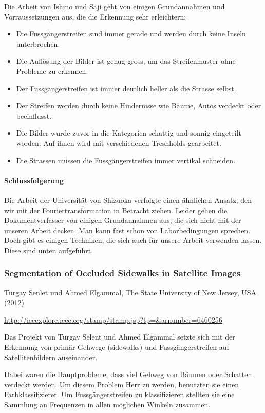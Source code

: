 Die Arbeit von Ishino und Saji geht von einigen Grundannahmen und Vorraussetzungen aus, die die Erkennung sehr erleichtern:

\begin{itemize}
	\item Die Fussgängerstreifen sind immer gerade und werden durch keine Inseln unterbrochen.
	\item Die Auflösung der Bilder ist genug gross, um das Streifenmuster ohne Probleme zu erkennen.
	\item Der Fussgängerstreifen ist immer deutlich heller als die Strasse selbst.
	\item Der Streifen werden durch keine Hindernisse wie Bäume, Autos verdeckt oder beeinflusst.
	\item Die Bilder wurde zuvor in die Kategorien schattig und sonnig eingeteilt worden. Auf ihnen wird mit verschiedenen Treshholds gearbeitet.
	\item Die Strassen müssen die Fussgängerstreifen immer vertikal schneiden.
\end{itemize}

\paragraph{Schlussfolgerung}
Die Arbeit der Universität von Shizuoka verfolgte einen ähnlichen Ansatz, den wir mit der Fouriertransformation in Betracht ziehen. Leider gehen die Dokumentverfasser von einigen Grundannahmen aus, die sich nicht mit der unseren Arbeit decken. Man kann fast schon von Laborbedingungen sprechen.
Doch gibt es einigen Techniken, die sich auch für unsere Arbeit verwenden lassen. Diese sind unten aufgeführt.

\subsubsection{Segmentation of Occluded Sidewalks in Satellite Images}
Turgay Senlet und Ahmed Elgammal, The State University of New Jersey, USA (2012) \newline

\onehalfspacing
\url{http://ieeexplore.ieee.org/stamp/stamp.jsp?tp=\&arnumber=6460256}
\onehalfspacing
\newline


Das Projekt von Turgay Selent und Ahmed Elgammal setzte sich mit der Erkennung von primär Gehwege (sidewalks) und Fussgängerstreifen auf Satellitenbildern auseinander.

Dabei waren die Hauptprobleme, dass viel Gehweg von Bäumen oder Schatten verdeckt werden. Um diesem Problem Herr zu werden, benutzten sie einen Farbklassifizierer.
Um Fussgängerstreifen zu klassifizieren stellten sie eine Sammlung an Frequenzen in allen möglichen Winkeln zusammen. 

